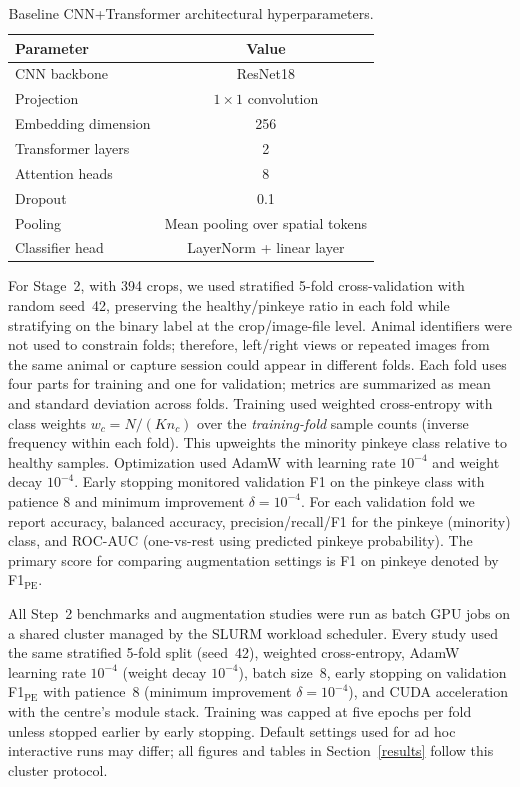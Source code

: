\documentclass[preprint,12pt,authoryear]{elsarticle}
\begin{document}
\begin{table}[t]
  \caption{Baseline CNN+Transformer architectural hyperparameters.}
  \label{tab:baseline_cnn_transformer}
  \centering
  \begin{tabular}{lc}
    \toprule
    \textbf{Parameter} & \textbf{Value} \\
    \midrule
    CNN backbone & ResNet18 \\
    Projection & $1 \times 1$ convolution \\
    Embedding dimension & 256 \\
    Transformer layers & 2 \\
    Attention heads & 8 \\
    Dropout & 0.1 \\
    Pooling & Mean pooling over spatial tokens \\
    Classifier head & LayerNorm + linear layer \\
    \bottomrule
  \end{tabular}
\end{table}


For Stage~2, with 394 crops, we used stratified 5-fold cross-validation with random seed~42, preserving the healthy/pinkeye ratio in each fold while stratifying on the binary label at the crop/image-file level. Animal identifiers were not used to constrain folds; therefore, left/right views or repeated images from the same animal or capture session could appear in different folds. Each fold uses four parts for training and one for validation; metrics are summarized as mean and standard deviation across folds. Training used weighted cross-entropy with class weights $w_c = N / (K n_c)$ over the \emph{training-fold} sample counts (inverse frequency within each fold). This upweights the minority pinkeye class relative to healthy samples. Optimization used AdamW \citep{loshchilov2018adamw} with learning rate $10^{-4}$ and weight decay $10^{-4}$. Early stopping monitored validation F1 on the pinkeye class with patience 8 and minimum improvement $\delta = 10^{-4}$. For each validation fold we report accuracy, balanced accuracy, precision/recall/F1 for the pinkeye (minority) class, and ROC-AUC (one-vs-rest using predicted pinkeye probability). The primary score for comparing augmentation settings is F1 on pinkeye denoted by F1$_{\mathrm{PE}}$.


All Step~2 benchmarks and augmentation studies were run as batch GPU jobs on a shared cluster managed by the SLURM workload scheduler. Every study used the same stratified 5-fold split (seed~42), weighted cross-entropy, AdamW learning rate $10^{-4}$ (weight decay $10^{-4}$), batch size~8, early stopping on validation F1$_{\mathrm{PE}}$ with patience~8 (minimum improvement $\delta{=}10^{-4}$), and CUDA acceleration with the centre's module stack. Training was capped at five epochs per fold unless stopped earlier by early stopping. Default settings used for ad hoc interactive runs may differ; all figures and tables in Section~\ref{results} follow this cluster protocol.
\end{document}
